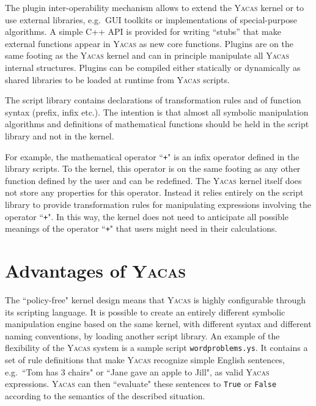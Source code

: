 \documentclass{llncs}
\begin{document}
The plugin inter-operability mechanism allows to extend the \textsc{Yacas} kernel or to use external libraries, e.g.~GUI toolkits or implementations of special-purpose algorithms. A simple C++ API is provided for writing ``stubs'' that make external functions appear in \textsc{Yacas} as new core functions. Plugins are on the same footing as the \textsc{Yacas} kernel and can in principle manipulate all \textsc{Yacas} internal structures. Plugins can be compiled either statically or dynamically as shared libraries to be loaded at runtime from \textsc{Yacas} scripts. 

%
The script library contains declarations of transformation rules and of function
syntax (prefix, infix etc.). The intention is that almost all symbolic manipulation algorithms and definitions
of mathematical functions should be held in the script library and not in the kernel. 


For example, the mathematical operator ``\texttt{+}" is an infix operator defined in the
library scripts. To the kernel, this operator is on the same footing as any
other function defined by the user and can be redefined. The \textsc{Yacas} kernel
itself does not store any properties for this operator. Instead it relies
entirely on the script library to provide transformation rules for manipulating
expressions involving the operator ``\texttt{+}". In this way, the kernel does not need
to anticipate all possible meanings of the operator ``\texttt{+}" that users might need
in their calculations.

\section{Advantages of \textsc{Yacas}}

The ``policy-free" kernel design means that \textsc{Yacas} is highly configurable
through its scripting language. It is possible to create an entirely different
symbolic manipulation engine based on the same kernel, with different syntax
and different naming  conventions, by loading another script library. An example of the flexibility of the
\textsc{Yacas} system is a sample script \texttt{wordproblems.ys}. It contains
a set of rule definitions that make \textsc{Yacas} recognize simple English
sentences, e.g.~``Tom has 3 chairs" or ``Jane gave an apple to Jill", as
valid \textsc{Yacas} expressions. \textsc{Yacas} can then ``evaluate" these
sentences to \texttt{True} or \texttt{False} according to the semantics of the
described situation.
\end{document}
